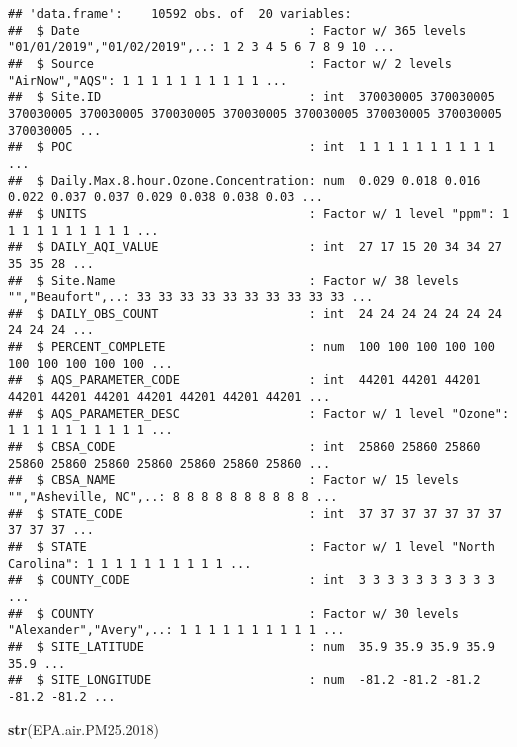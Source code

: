 \documentclass[]{article}
\newenvironment{Shaded}{\begin{snugshade}}{\end{snugshade}}
\newcommand{\FloatTok}[1]{\textcolor[rgb]{0.00,0.00,0.81}{#1}}
\newcommand{\KeywordTok}[1]{\textcolor[rgb]{0.13,0.29,0.53}{\textbf{#1}}}
\newcommand{\NormalTok}[1]{#1}
\begin{document}
\begin{verbatim}
## 'data.frame':    10592 obs. of  20 variables:
##  $ Date                                : Factor w/ 365 levels "01/01/2019","01/02/2019",..: 1 2 3 4 5 6 7 8 9 10 ...
##  $ Source                              : Factor w/ 2 levels "AirNow","AQS": 1 1 1 1 1 1 1 1 1 1 ...
##  $ Site.ID                             : int  370030005 370030005 370030005 370030005 370030005 370030005 370030005 370030005 370030005 370030005 ...
##  $ POC                                 : int  1 1 1 1 1 1 1 1 1 1 ...
##  $ Daily.Max.8.hour.Ozone.Concentration: num  0.029 0.018 0.016 0.022 0.037 0.037 0.029 0.038 0.038 0.03 ...
##  $ UNITS                               : Factor w/ 1 level "ppm": 1 1 1 1 1 1 1 1 1 1 ...
##  $ DAILY_AQI_VALUE                     : int  27 17 15 20 34 34 27 35 35 28 ...
##  $ Site.Name                           : Factor w/ 38 levels "","Beaufort",..: 33 33 33 33 33 33 33 33 33 33 ...
##  $ DAILY_OBS_COUNT                     : int  24 24 24 24 24 24 24 24 24 24 ...
##  $ PERCENT_COMPLETE                    : num  100 100 100 100 100 100 100 100 100 100 ...
##  $ AQS_PARAMETER_CODE                  : int  44201 44201 44201 44201 44201 44201 44201 44201 44201 44201 ...
##  $ AQS_PARAMETER_DESC                  : Factor w/ 1 level "Ozone": 1 1 1 1 1 1 1 1 1 1 ...
##  $ CBSA_CODE                           : int  25860 25860 25860 25860 25860 25860 25860 25860 25860 25860 ...
##  $ CBSA_NAME                           : Factor w/ 15 levels "","Asheville, NC",..: 8 8 8 8 8 8 8 8 8 8 ...
##  $ STATE_CODE                          : int  37 37 37 37 37 37 37 37 37 37 ...
##  $ STATE                               : Factor w/ 1 level "North Carolina": 1 1 1 1 1 1 1 1 1 1 ...
##  $ COUNTY_CODE                         : int  3 3 3 3 3 3 3 3 3 3 ...
##  $ COUNTY                              : Factor w/ 30 levels "Alexander","Avery",..: 1 1 1 1 1 1 1 1 1 1 ...
##  $ SITE_LATITUDE                       : num  35.9 35.9 35.9 35.9 35.9 ...
##  $ SITE_LONGITUDE                      : num  -81.2 -81.2 -81.2 -81.2 -81.2 ...
\end{verbatim}

\begin{Shaded}
\begin{Highlighting}[]
\KeywordTok{str}\NormalTok{(EPA.air.PM25}\FloatTok{.2018}\NormalTok{)}
\end{Highlighting}
\end{Shaded}
\end{document}
